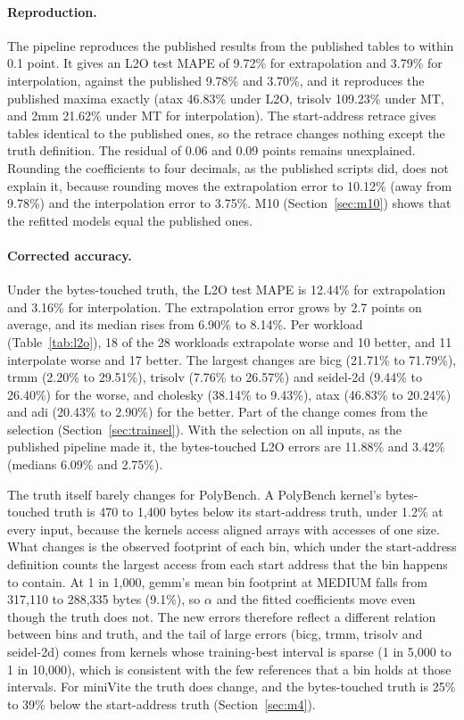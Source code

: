 \documentclass[11pt]{article}
\begin{document}
\paragraph{Reproduction.}
The pipeline reproduces the published results from the published tables to within 0.1 point. It gives an L2O test
MAPE of 9.72\% for extrapolation and 3.79\% for interpolation, against the published 9.78\% and 3.70\%, and it
reproduces the published maxima exactly (atax 46.83\% under L2O, trisolv 109.23\% under MT, and 2mm 21.62\% under
MT for interpolation). The start-address retrace gives tables identical to the published ones, so the retrace
changes nothing except the truth definition. The residual of 0.06 and 0.09 points remains unexplained. Rounding the
coefficients to four decimals, as the published scripts did, does not explain it, because rounding moves the
extrapolation error to 10.12\% (away from 9.78\%) and the interpolation error to 3.75\%. M10 (Section~\ref{sec:m10}) shows that the refitted models equal the published ones.

\paragraph{Corrected accuracy.}
Under the bytes-touched truth, the L2O test MAPE is 12.44\% for extrapolation and 3.16\% for interpolation. The
extrapolation error grows by 2.7 points on average, and its median rises from 6.90\% to 8.14\%. Per workload
(Table~\ref{tab:l2o}), 18 of the 28 workloads extrapolate worse and 10 better, and 11 interpolate worse and 17
better. The largest changes are bicg (21.71\% to 71.79\%), trmm (2.20\% to 29.51\%), trisolv (7.76\% to 26.57\%)
and seidel-2d (9.44\% to 26.40\%) for the worse, and cholesky (38.14\% to 9.43\%), atax (46.83\% to 20.24\%) and adi
(20.43\% to 2.90\%) for the better. Part of the change comes from the selection (Section~\ref{sec:trainsel}). With
the selection on all inputs, as the published pipeline made it, the bytes-touched L2O errors are 11.88\% and 3.42\%
(medians 6.09\% and 2.75\%).

The truth itself barely changes for PolyBench. A PolyBench kernel's bytes-touched truth is 470 to 1,400 bytes
below its start-address truth, under 1.2\% at every input, because the kernels access aligned arrays with accesses
of one size. What changes is the observed footprint of each bin, which under the start-address definition counts
the largest access from each start address that the bin happens to contain. At 1 in 1,000, gemm's mean bin
footprint at MEDIUM falls from 317,110 to 288,335 bytes (9.1\%), so $\alpha$ and the fitted coefficients move
even though the truth does not. The new errors therefore reflect a different relation between bins and truth, and
the tail of large errors (bicg, trmm, trisolv and seidel-2d) comes from kernels whose training-best interval is
sparse (1 in 5,000 to 1 in 10,000), which is consistent with the few references that a bin holds at those
intervals. For miniVite the truth does change, and the
bytes-touched truth is 25\% to 39\% below the start-address truth (Section~\ref{sec:m4}).
\end{document}
